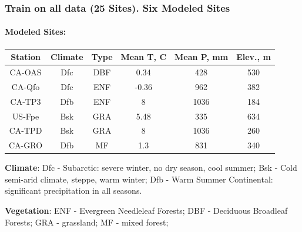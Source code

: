 \documentclass{beamer}
\begin{document}
\begin{frame}
\frametitle{Train on all data (25 Sites). Six Modeled Sites}
\framesubtitle{Modeled Sites:}
\begin{center}
\begin{tabular}{| c | c | c | c | c | c |}
\hline
Station   & Climate & Type & Mean T, C & Mean P, mm & Elev., m\\ \hline
CA-OAS & Dfc     & DBF  & 0.34      & 428        & 530 \\\hline
CA-Qfo & Dfc     & ENF  & -0.36     & 962        & 382 \\\hline
CA-TP3 & Dfb     & ENF  & 8         & 1036       & 184 \\\hline
US-Fpe & Bsk     & GRA  & 5.48      & 335        & 634 \\\hline
CA-TPD & Bsk     & GRA  & 8         & 1036       & 260 \\\hline
CA-GRO & Dfb     & MF   & 1.3         & 831       & 340 \\\hline

\hline
\end{tabular}
\end{center}
\textbf{Climate}:
Dfc - Subarctic: severe winter, no dry season, cool summer;
Bsk - Cold semi-arid climate, steppe, warm winter;
Dfb - Warm Summer Continental: significant precipitation in all seasons.

\textbf{Vegetation}:
ENF - Evergreen Needleleaf Forests;
DBF - Deciduous Broadleaf Forests;
GRA - grassland;
MF - mixed forest;

\end{frame}
\end{document}

